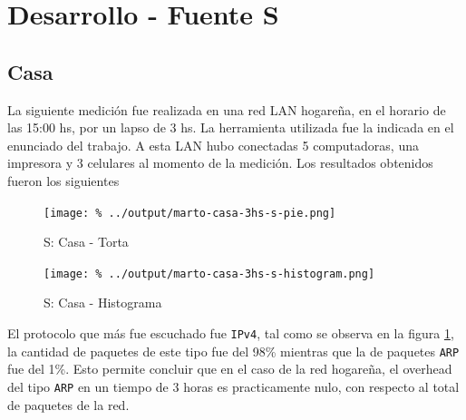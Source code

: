 \documentclass[final,inline,a4paper,narroweqnarray]{ieee}
\begin{document}
\section{Desarrollo - Fuente S}
  \subsection{Casa}

  La siguiente medición fue realizada en una red LAN hogareña, en el
  horario de las 15:00 hs, por un lapso de 3 hs. La herramienta
  utilizada fue la indicada en el enunciado del trabajo. A esta LAN
  hubo conectadas 5 computadoras, una impresora y 3 celulares al
  momento de la medición. Los resultados obtenidos fueron los
  siguientes


    \begin{figure}[ht]\begin{center}
      \texttt{[image: \%
      ../output/marto-casa-3hs-s-pie.png]}
      \vspace{-3em}
      \caption{S: Casa - Torta}
      \label{marto-casa-3hs-s-pie}
    \end{center}\end{figure}

    
    \begin{figure}[ht]\begin{center}
     \texttt{[image: \%
      ../output/marto-casa-3hs-s-histogram.png]}
      \caption{S: Casa - Histograma}
      \label{marto-casa-3hs-s-histogram}
    \end{center}\end{figure}

    El protocolo que más fue escuchado fue \texttt{IPv4}, tal como se
    observa en la figura \ref{marto-casa-3hs-s-pie}, la cantidad de
    paquetes  de este tipo fue del 98\% mientras que la de paquetes
    \texttt{ARP} fue del 1\%. Esto permite concluir que en el caso de
    la red hogareña, el overhead del tipo \texttt{ARP} en un tiempo de
    3 horas es practicamente nulo, con respecto al total de paquetes
    de la red.
\end{document}

